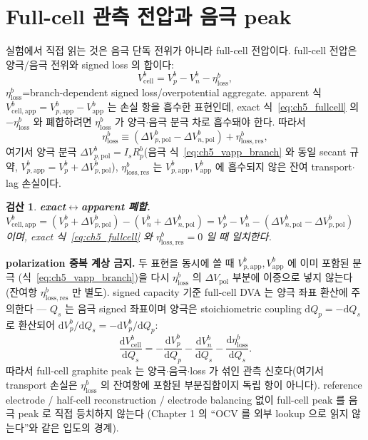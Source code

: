 \documentclass[11pt,a4paper]{article}
\newtheorem*{verifybox}{검산}
\newcommand{\dd}{\mathrm{d}}
\newcommand{\app}{\mathrm{app}}
\newcommand{\cell}{\mathrm{cell}}
\newcommand{\pol}{\mathrm{pol}}
\newcommand{\loss}{\mathrm{loss}}
\begin{document}
\section{Full-cell 관측 전압과 음극 peak}\label{sec:ch5_fullcell}
실험에서 직접 읽는 것은 음극 단독 전위가 아니라 full-cell 전압이다. full-cell 전압은 양극/음극 전위와 signed
loss 의 합이다:
\begin{equation}
V_\cell^b=V_p^b-V_n^b-\eta_\loss^b,
\label{eq:ch5_fullcell}
\end{equation}
$\eta_\loss^b$=branch-dependent signed loss/overpotential aggregate. apparent 식 $V_{\cell,\app}^b
=V_{p,\app}^b-V_{\app}^b$ 는 손실 항을 흡수한 표현인데, exact 식~\eqref{eq:ch5_fullcell} 의 $-\eta_\loss^b$ 와
폐합하려면 $\eta_\loss^b$ 가 양극$\cdot$음극 분극 차로 흡수돼야 한다. 따라서
\begin{equation}
\eta_\loss^b\equiv(\Delta V_{p,\pol}^b-\Delta V_{n,\pol}^b)+\eta_{\loss,\mathrm{res}}^b,
\label{eq:ch5_etaloss_def}
\end{equation}
여기서 양극 분극 $\Delta V_{p,\pol}^b=I_s R_p^b$(음극 식~\eqref{eq:ch5_vapp_branch} 와 동일 secant 규약,
$V_{p,\app}^b=V_p^b+\Delta V_{p,\pol}^b$), $\eta_{\loss,\mathrm{res}}^b$ 는 $V_{p,\app}^b,V_\app^b$ 에 흡수되지
않은 잔여 transport$\cdot$lag 손실이다.

\begin{verifybox}
\textbf{exact$\leftrightarrow$apparent 폐합.} $V_{\cell,\app}^b=(V_p^b+\Delta V_{p,\pol}^b)-(V_n^b+\Delta V_{n,\pol}^b)
=V_p^b-V_n^b-(\Delta V_{n,\pol}^b-\Delta V_{p,\pol}^b)$ 이며, exact 식~\eqref{eq:ch5_fullcell} 와
$\eta_{\loss,\mathrm{res}}^b=0$ 일 때 일치한다.
\end{verifybox}

\textbf{polarization 중복 계상 금지.} 두 표현을 동시에 쓸 때 $V_{p,\app}^b,V_\app^b$ 에 이미 포함된 분극
(식~\eqref{eq:ch5_vapp_branch})을 다시 $\eta_\loss^b$ 의 $\Delta V_\pol$ 부분에 이중으로 넣지 않는다(잔여항
$\eta_{\loss,\mathrm{res}}^b$ 만 별도). signed capacity 기준 full-cell DVA 는 양극 좌표 환산에 주의한다 — $Q_s$
는 음극 signed 좌표이며 양극은 stoichiometric coupling $\dd Q_p=-\dd Q_s$ 로 환산되어 $\dd V_p^b/\dd Q_s
=-\dd V_p^b/\dd Q_p$:
\begin{equation}
\frac{\dd V_\cell^b}{\dd Q_s}=-\frac{\dd V_p^b}{\dd Q_p}-\frac{\dd V_n^b}{\dd Q_s}-\frac{\dd\eta_\loss^b}{\dd Q_s}.
\label{eq:ch5_fullcell_dva}
\end{equation}
따라서 full-cell graphite peak 는 양극$\cdot$음극$\cdot$loss 가 섞인 관측 신호다(여기서 transport 손실은
$\eta_\loss^b$ 의 잔여항에 포함된 부분집합이지 독립 항이 아니다). reference electrode / half-cell reconstruction /
electrode balancing 없이 full-cell peak 를 음극 peak 로 직접 등치하지 않는다 \cite{bardfaulkner,newman2004}(Chapter 1
의 ``OCV 를 외부 lookup 으로 읽지 않는다''와 같은 입도의 경계).
\end{document}
